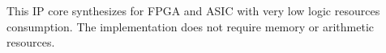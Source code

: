 %

This IP core synthesizes for FPGA and ASIC with very low logic resources
consumption. The implementation does not require memory or arithmetic resources.
